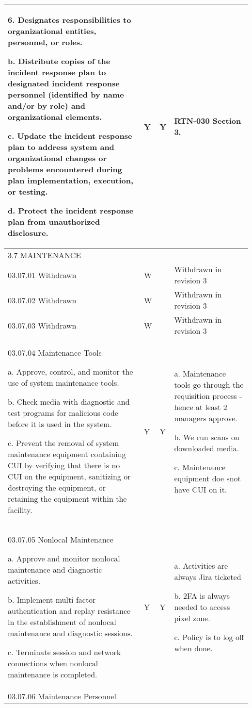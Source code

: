 \begin{longtable} {|p{}|p{}|p{}|p{} |}
{6. Designates responsibilities to organizational entities, personnel, or roles.

b. Distribute copies of the incident response plan to designated incident response personnel (identified by name and/or by role) and organizational elements.

c. Update the incident response plan to address system and organizational changes or problems encountered during plan implementation, execution, or testing.

d. Protect the incident response plan from unauthorized disclosure.}&{Y}&{Y}&{RTN-030 Section 3.} \\ \hline
{3.7 MAINTENANCE}&&& \\ \hline
{03.07.01 Withdrawn}&{W}&{}&{Withdrawn in revision 3} \\ \hline
{03.07.02 Withdrawn}&{W}&{}&{Withdrawn in revision 3} \\ \hline
{03.07.03 Withdrawn}&{W}&{}&{Withdrawn in revision 3} \\ \hline
{03.07.04 Maintenance Tools

a. Approve, control, and monitor the use of system maintenance tools.

b. Check media with diagnostic and test programs for malicious code before it is used in the system.

c. Prevent the removal of system maintenance equipment containing CUI by verifying that there is no CUI on the equipment, sanitizing or destroying the equipment, or retaining the equipment within the facility.}&{Y}&{Y}&{a. Maintenance tools go through the requisition process - hence at least 2 managers approve. 

b. We run scans on downloaded media.

c. Maintenance equipment doe snot have CUI on it. } \\ \hline
{03.07.05 Nonlocal Maintenance

a. Approve and monitor nonlocal maintenance and diagnostic activities.

b. Implement multi-factor authentication and replay resistance in the establishment of nonlocal maintenance and diagnostic sessions.

c. Terminate session and network connections when nonlocal maintenance is completed.}&{Y}&{Y}&{a. Activities are always Jira ticketed

b. 2FA is always needed to access pixel zone.

c. Policy is to log off when done.} \\ \hline
{03.07.06 Maintenance Personnel

}
\end{longtable}

